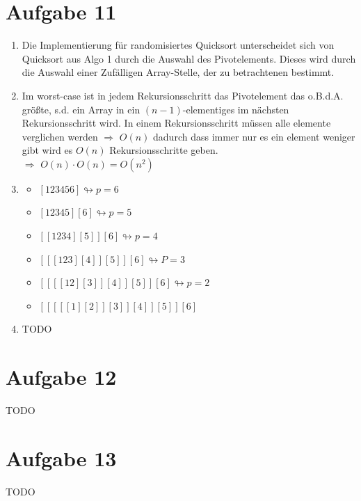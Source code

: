 \documentclass[10pt,a4paper]{article}
\begin{document}
\section*{Aufgabe 11}
    \begin{enumerate}[label={\alph*)}]
        \item
         Die Implementierung für randomisiertes Quicksort 
         unterscheidet sich von Quicksort aus Algo 1 durch die 
         Auswahl des Pivotelements. Dieses wird durch die Auswahl 
         einer Zufälligen Array-Stelle, der zu betrachtenen bestimmt.
         \item
          Im worst-case ist in jedem Rekursionsschritt das Pivotelement 
          das o.B.d.A. größte, s.d. ein Array in ein $(n-1)$-elementiges 
          im nächsten Rekursionsschritt wird. In einem Rekursionsschritt 
          müssen alle elemente verglichen werden $\Rightarrow$ $O(n)$ dadurch dass immer 
          nur es ein element weniger gibt wird es $O(n)$ Rekursionsschritte 
          geben.
          \\$\Rightarrow$ $O(n)\cdot O(n) = O(n^2)$
        \item
        \begin{itemize}
            \item $[123456] \looparrowright p=6$
            \item $[12345] [6] \looparrowright p=5$
            \item $[[1234] [5]] [6] \looparrowright p=4$
            \item $[[[123] [4]] [5]] [6] \looparrowright P=3$
            \item $[[[[12] [3]] [4]] [5]] [6] \looparrowright p=2$
            \item $[[[[[1] [2]] [3]] [4]] [5]] [6]$
        \end{itemize}
        \item TODO
           
    \end{enumerate}

    
\section*{Aufgabe 12}
    TODO
    
\section*{Aufgabe 13}
    TODO
    
    
    
\end{document}
